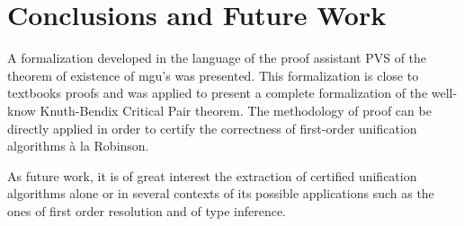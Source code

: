 \documentclass[submission,copyright,creativecommons]{eptcs}
\begin{document}
  \section{Conclusions and Future Work}\label{Sec:conclusion}

  A formalization developed in the language of the proof assistant PVS
  of the theorem of existence of mgu's was presented. This
  formalization is close to textbooks proofs and was applied to
  present a complete formalization of the well-know Knuth-Bendix
  Critical Pair theorem.  The methodology of proof can be directly
  applied in order to certify the correctness of first-order
  unification algorithms \`a la Robinson.

  As future work, it is of great interest the extraction of certified
  unification algorithms alone or in several contexts of its possible
  applications such as the ones of first order resolution and of type
  inference.

  
\end{document}
